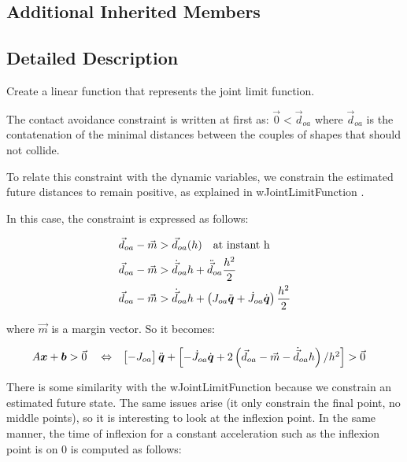 \subsection*{Additional Inherited Members}


\subsection{Detailed Description}
Create a linear function that represents the joint limit function. 

The contact avoidance constraint is written at first as\+: $ \vec{0} < \vec{d}_{oa} $ where $ \vec{d}_{oa} $ is the contatenation of the minimal distances between the couples of shapes that should not collide.



To relate this constraint with the dynamic variables, we constrain the estimated future distances to remain positive, as explained in w\+Joint\+Limit\+Function .

In this case, the constraint is expressed as follows\+:

\begin{align*} \vec{d}_{oa} - \vec{m} &> \vec{d}_{oa}(h) \quad \text{at instant h} \\ \vec{d}_{oa} - \vec{m} &> \dot{\vec{d}}_{oa} h + \ddot{\vec{d}}_{oa} \frac{h^2}{2} \\ \vec{d}_{oa} - \vec{m} &> \dot{\vec{d}}_{oa} h + \left( J_{oa} \ddot{\mbox{\boldmath${q}$}} + \dot{J}_{oa} \dot{\mbox{\boldmath${q}$}} \right) \frac{h^2}{2} \end{align*}

where $ \vec{m} $ is a margin vector. So it becomes\+:

\begin{align*} A \mbox{\boldmath${x}$} + \mbox{\boldmath${b}$} &> \vec{0} & &\Leftrightarrow & \begin{bmatrix} - J_{oa} \end{bmatrix} \ddot{\mbox{\boldmath${q}$}} + \begin{bmatrix} - \dot{J}_{oa} \dot{\mbox{\boldmath${q}$}} + 2 \left( \vec{d}_{oa} - \vec{m} - \dot{\vec{d}}_{oa} h \right) / h^2 \end{bmatrix} & > \vec{0} \end{align*}

There is some similarity with the w\+Joint\+Limit\+Function because we constrain an estimated future state. The same issues arise (it only constrain the final point, no middle points), so it is interesting to look at the inflexion point. In the same manner, the time of inflexion for a constant acceleration such as the inflexion point is on 0 is computed as follows\+:

